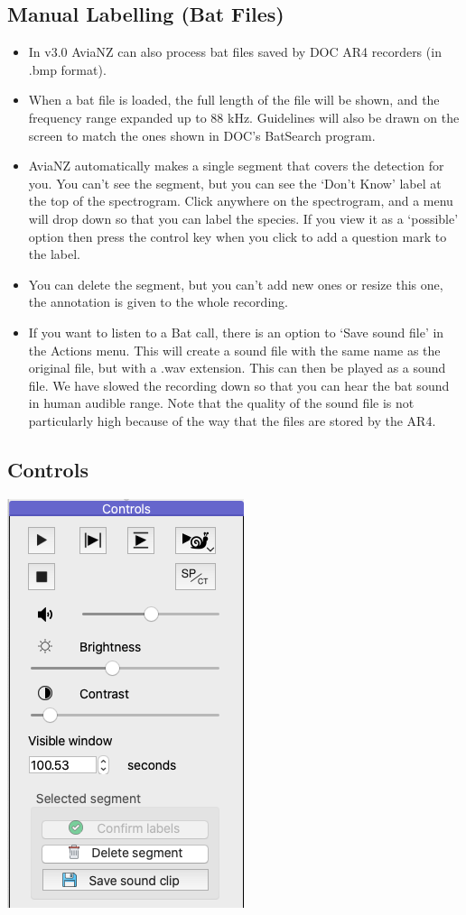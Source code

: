 \documentclass{article}
\begin{document}
\subsection{Manual Labelling (Bat Files) \label{sec:bats}}

\begin{itemize}
\item In v3.0 AviaNZ can also process bat files saved by DOC AR4 recorders (in .bmp format). 
\item When a bat file is loaded, the full length of the file will be shown, and the frequency range expanded up to 88 kHz. Guidelines will also be drawn on the screen to match the ones shown in DOC's BatSearch program. 
\item AviaNZ automatically makes a single segment that covers the detection for you. You can't see the segment, but you can see the `Don't Know' label at the top of the spectrogram. Click anywhere on the spectrogram, and a menu will drop down so that you can label the species. If you view it as a `possible' option then press the control key when you click to add a question mark to the label.
\item You can delete the segment, but you can't add new ones or resize this one, the annotation is given to the whole recording.
\item If you want to listen to a Bat call, there is an option to `Save sound file' in the Actions menu. This will create a sound file with the same name as the original file, but with a .wav extension. This can then be played as a sound file. We have slowed the recording down so that you can hear the bat sound in human audible range. Note that the quality of the sound file is not particularly high because of the way that the files are stored by the AR4. 
\end{itemize}

\subsection{Controls \label{sec:play}}

\begin{center}
\includegraphics[width=.3\textwidth]{Figures/Controls.png}
\end{center}
\end{document}
